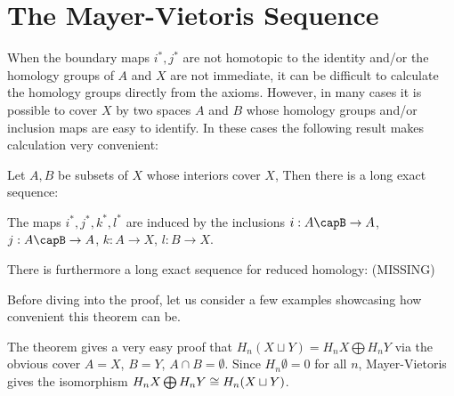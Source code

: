 \section{The Mayer-Vietoris Sequence}
When the boundary maps $i^*,j^*$ are not homotopic to the identity and/or the homology groups of $A$ and $X$ are not immediate, it can be difficult to calculate the homology groups directly from the axioms. However, in many cases it is possible to cover $X$ by two spaces $A$ and $B$ whose homology groups and/or inclusion maps are easy to identify. In these cases the following result makes calculation very convenient:

\begin{theorem}\label{mayer-vietoris}
Let $A,B$ be subsets of $X$ whose interiors cover $X$, Then there is a long exact sequence:


The maps $i^*,j^*,k^*,l^*$ are induced by the inclusions $i:A\capB\rightarrow A$, $j:A\capB\rightarrow A$, $k:A\rightarrow X$, $l:B\rightarrow X$.


There is furthermore a long exact sequence for reduced homology: (MISSING)

\end{theorem}

Before diving into the proof, let us consider a few examples showcasing how convenient this theorem can be.

\begin{example}
The theorem gives a very easy proof that $H_n(X\sqcup Y)=H_nX \bigoplus H_n Y$ via the obvious cover $A=X$, $B=Y$, $A\cap B=\emptyset$. Since $H_n \emptyset=0$ for all $n$, Mayer-Vietoris gives the isomorphism $H_nX \bigoplus H_nY \cong H_n(X\sqcup Y)$.
\end{example}

